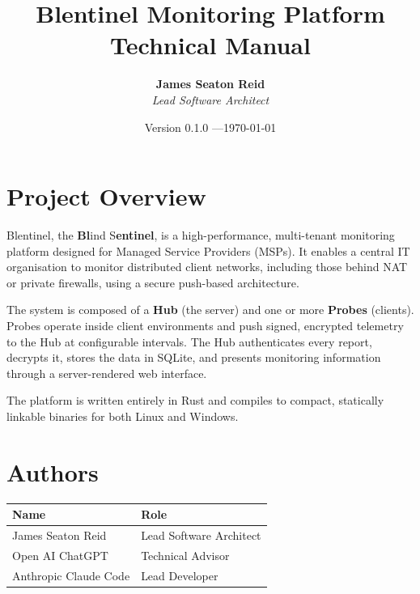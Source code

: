 \documentclass[12pt]{report}
\title{Blentinel Monitoring Platform\\
\large Technical Manual}
\author{
    \textbf{James Seaton Reid}\\
    \textit{Lead Software Architect}
}
\date{Version 0.1.0 \quad---\quad \today}
\begin{document}
\maketitle
\tableofcontents
\newpage


\chapter*{Project Overview}

Blentinel, the \textbf{Bl}ind S\textbf{entinel}, is a high-performance,
multi-tenant monitoring platform designed for Managed Service Providers
(MSPs). It enables a central IT organisation to monitor distributed
client networks, including those behind NAT or private firewalls,
using a secure push-based architecture.

The system is composed of a \textbf{Hub} (the server) and one or more \textbf{Probes} (clients).
Probes operate inside client environments and push signed, encrypted telemetry
to the Hub at configurable intervals. The Hub authenticates every report,
decrypts it, stores the data in SQLite, and presents monitoring information
through a server-rendered web interface.

The platform is written entirely in Rust and compiles to compact, statically
linkable binaries for both Linux and Windows.

\chapter*{Authors}

\begin{longtable}{ll}
\toprule
\textbf{Name} & \textbf{Role} \\
\midrule
James Seaton Reid & Lead Software Architect \\
Open AI ChatGPT & Technical Advisor \\
Anthropic Claude Code & Lead Developer \\

\bottomrule
\end{longtable}

\end{document}
